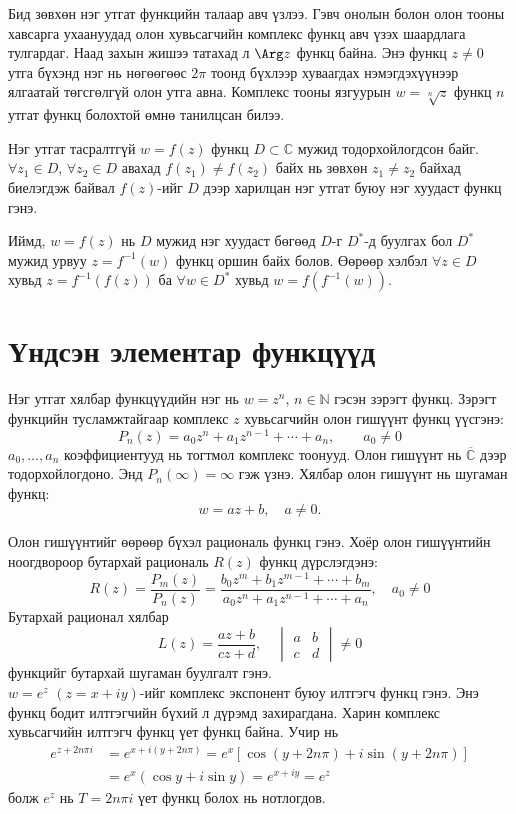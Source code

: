 Бид зөвхөн нэг утгат функцийн талаар авч үзлээ. Гэвч онолын болон олон тооны хавсарга ухаануудад олон хувьсагчийн комплекс функц авч үзэх шаардлага тулгардаг. Наад захын жишээ татахад л $\Arg  z$ функц байна. Энэ функц $z\neq 0$ утга бүхэнд нэг нь нөгөөгөөс $2\pi $ тоонд бүхлээр хуваагдах нэмэгдэхүүнээр ялгаатай төгсгөлгүй олон утга авна. Комплекс тооны язгуурын $w=\sqrt[n]{z}$ функц $n$ утгат функц болохтой өмнө танилцсан билээ. 

Нэг утгат тасралтгүй $w=f(z)$ функц $D\subset \mathbb{C}$ мужид тодорхойлогдсон байг. $\forall z_1\in D$, $\forall z_2\in D$ авахад $f(z_1)\neq f(z_2)$ байх нь зөвхөн $z_1\neq z_2$ байхад биелэгдэж байвал $f(z)$-ийг $D$ дээр харилцан нэг утгат буюу нэг хуудаст функц гэнэ.

Иймд, $w=f(z)$ нь $D$ мужид нэг хуудаст бөгөөд $D$-г $D^*$-д буулгах бол $D^*$ мужид урвуу $z=f^{-1}(w)$ функц оршин байх болов. Өөрөөр хэлбэл  $\forall z\in D$ хувьд $z=f^{-1}(f(z))$ ба $\forall w\in D^*$ хувьд $w=f(f^{-1}(w))$.
\section{Үндсэн элементар функцүүд}
Нэг утгат хялбар функцүүдийн нэг нь $w=z^n$, $n\in \mathbb{N}$ гэсэн зэрэгт функц. Зэрэгт функцийн тусламжтайгаар комплекс $z$ хувьсагчийн олон гишүүнт функц үүсгэнэ:
\begin{equation}
P_n(z)=a_0z^n+a_1z^{n-1}+\cdots +a_n, \qquad a_0\neq 0
\end{equation}
$a_0, \ldots , a_n$ коэффициентууд нь тогтмол комплекс тоонууд. Олон гишүүнт нь $\overline{\mathbb{C}}$ дээр тодорхойлогдоно. Энд $P_n(\infty)=\infty$ гэж үзнэ. Хялбар олон гишүүнт нь шугаман функц:
$$w=az+b, \quad a\neq 0.$$

Олон гишүүнтийг өөрөөр бүхэл рациональ функц гэнэ. Хоёр олон гишүүнтийн ноогдвороор бутархай рациональ $R(z) $ функц дүрслэгдэнэ:
\begin{equation}
R(z)=\dfrac{P_m(z)}{P_n(z)}=\dfrac{b_0z^m+b_1z^{m-1}+\cdots +b_m}{a_0z^n+a_1z^{n-1}+\cdots +a_n}, \quad a_0\neq 0
\end{equation}
Бутархай рационал хялбар
\begin{equation}
L(z)=\dfrac{az+b}{cz+d}, \quad
\begin{vmatrix}
a&b\\
c&d
\end{vmatrix}\neq 0
\end{equation}
функцийг бутархай шугаман буулгалт гэнэ. \\ $w=e^z$ \quad $(z=x+iy)$-ийг комплекс экспонент буюу илтгэгч функц гэнэ. Энэ функц бодит илтгэгчийн бүхий л дүрэмд захирагдана. Харин комплекс хувьсагчийн илтгэгч функц үет функц байна. Учир нь
\begin{align*}
    e^{z+2n\pi i}&= e^{x+i(y+2n\pi)}=e^x[\cos (y+2n\pi)+i\sin (y+2n\pi)] \\
    &=e^x(\cos y+i\sin y)=e^{x+iy}=e^z
\end{align*}
болж $e^z$ нь $T=2n\pi i$ үет функц болох нь нотлогдов.

